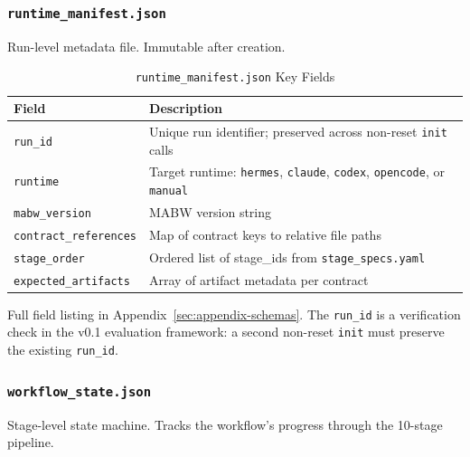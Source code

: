 \documentclass[11pt,a4paper]{article}
\begin{document}
\subsubsection{\texttt{runtime\_manifest.json}}

Run-level metadata file. Immutable after creation.

\begin{table}[ht]
\centering
\caption{\texttt{runtime\_manifest.json} Key Fields}
\label{tab:runtime-manifest}
\begin{tabular}{@{}ll@{}}
\toprule
\textbf{Field} & \textbf{Description} \\
\midrule
\texttt{run\_id} & Unique run identifier; preserved across non-reset \texttt{init} calls \\
\texttt{runtime} & Target runtime: \texttt{hermes}, \texttt{claude}, \texttt{codex}, \texttt{opencode}, or \texttt{manual} \\
\texttt{mabw\_version} & MABW version string \\
\texttt{contract\_references} & Map of contract keys to relative file paths \\
\texttt{stage\_order} & Ordered list of stage\_ids from \texttt{stage\_specs.yaml} \\
\texttt{expected\_artifacts} & Array of artifact metadata per contract \\
\bottomrule
\end{tabular}
\end{table}

Full field listing in Appendix~\ref{sec:appendix-schemas}. The \texttt{run\_id} is a verification check in the v0.1 evaluation framework: a second non-reset \texttt{init} must preserve the existing \texttt{run\_id}.

\subsubsection{\texttt{workflow\_state.json}}

Stage-level state machine. Tracks the workflow's progress through the 10-stage pipeline.
\end{document}
